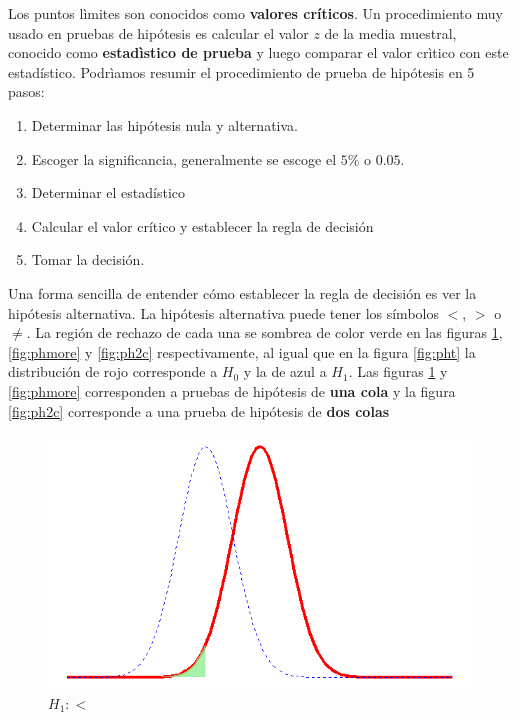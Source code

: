 \documentclass[letterpaper,]{book}
\providecommand{\tightlist}{%
  \setlength{\itemsep}{0pt}\setlength{\parskip}{0pt}}
\begin{document}
Los puntos lìmites son conocidos como \textbf{valores críticos}. Un procedimiento muy usado en pruebas de hipótesis es calcular el valor \(z\) de la media muestral, conocido como \textbf{estadìstico de prueba} y luego comparar el valor crìtico con este estadístico. Podrìamos resumir el procedimiento de prueba de hipótesis en 5 pasos:

\begin{enumerate}
\def\labelenumi{\arabic{enumi}.}
\tightlist
\item
  Determinar las hipótesis nula y alternativa.
\item
  Escoger la significancia, generalmente se escoge el \(5\%\) o \(0.05\).
\item
  Determinar el estadístico
\item
  Calcular el valor crítico y establecer la regla de decisión
\item
  Tomar la decisión.
\end{enumerate}

Una forma sencilla de entender cómo establecer la regla de decisión es ver la hipótesis alternativa. La hipótesis alternativa puede tener los símbolos \(<\), \(>\) o \(\neq\). La región de rechazo de cada una se sombrea de color verde en las figuras \ref{fig:phless}, \ref{fig:phmore} y \ref{fig:ph2c} respectivamente, al igual que en la figura \ref{fig:pht} la distribución de rojo corresponde a \(H_0\) y la de azul a \(H_1\). Las figuras \ref{fig:phless} y \ref{fig:phmore} corresponden a pruebas de hipótesis de \textbf{una cola} y la figura \ref{fig:ph2c} corresponde a una prueba de hipótesis de \textbf{dos colas}

\begin{figure}[h!]

{\centering \includegraphics[width=0.6\linewidth]{phless} 

}

\caption{$H_1:<$}\label{fig:phless}
\end{figure}
\end{document}
